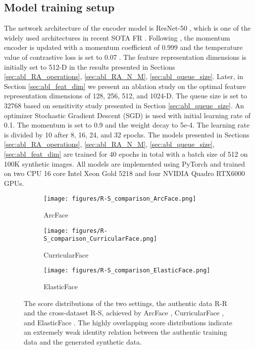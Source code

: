 \documentclass[10pt,twocolumn,letterpaper]{ieeeconf}
\begin{document}
\subsection{Model training setup}
The network architecture of the encoder model is ResNet-50 \cite{ResNet}, which is one of the widely used architectures in recent SOTA FR \cite{ArcFace, PartialFC, CurricularFace, ElasticFace}. Following \cite{Moco}, the momentum encoder is updated with a momentum coefficient of 0.999 \cite{Moco} and the temperature value  of contrastive loss is set to 0.07 \cite{Moco}. The feature representation dimensions is initially set to 512-D in the results presented in Sections \ref{sec:abl_RA_operations}, \ref{sec:abl_RA_N_M}, \ref{sec:abl_queue_size}.
Later, in Section \ref{sec:abl_feat_dim} we present an ablation study on the optimal feature representation dimensions of 128, 256, 512, and 1024-D. The queue size is set to 32768 based on sensitivity study presented in Section \ref{sec:abl_queue_size}. 
An optimizer Stochastic Gradient Descent (SGD) is used with initial learning rate of 0.1. The momentum is set to 0.9 and the weight decay to 5e-4. The learning rate is divided by 10 after 8, 16, 24, and 32 epochs. The models presented in Sections \ref{sec:abl_RA_operations}, \ref{sec:abl_RA_N_M}, \ref{sec:abl_queue_size}, \ref{sec:abl_feat_dim} are trained for 40 epochs in total with a batch size of 512 on 100K synthetic images. 
All models are implemented using PyTorch \cite{PyTorch} and trained on two CPU 16 core Intel Xeon Gold 5218 and four NVIDIA Quadro RTX6000 GPUs.



\begin{figure*}[ht!]
	\centering
    \begin{subfigure}[b]{0.25\linewidth}
        \centering
        \texttt{[image: figures/R-S\_comparison\_ArcFace.png]}
        \caption{ArcFace}
        \label{fig:R-S_ArcFace}
    \end{subfigure}
\begin{subfigure}[b]{0.25\linewidth}
        \centering
        \texttt{[image: figures/R-S\_comparison\_CurricularFace.png]}
        \caption{CurricularFace}
        \label{fig:R-S_CurricularFace}
    \end{subfigure}
\begin{subfigure}[b]{0.25\linewidth}
        \centering
        \texttt{[image: figures/R-S\_comparison\_ElasticFace.png]}
        \caption{ElasticFace}
        \label{fig:R-S_ElasticFace}
    \end{subfigure}
    \vspace{-3mm}
	\caption{The score distributions of the two settings, the authentic data R-R and the cross-dataset R-S, achieved by ArcFace \cite{ArcFace}, CurricularFace \cite{CurricularFace}, and ElasticFace \cite{ElasticFace}. The highly overlapping score distributions indicate an extremely weak identity relation between the authentic training data and the generated synthetic data.}
	\label{fig:R-S_comparison}
	\vspace{-4mm}
\end{figure*}
\end{document}
